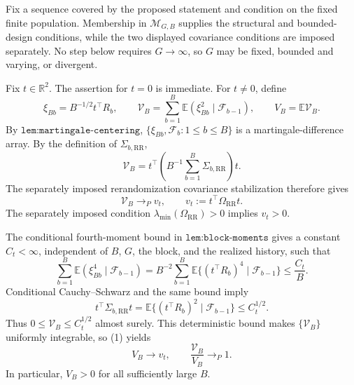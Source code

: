 Fix a sequence covered by the proposed statement and condition on the fixed finite population.  Membership in \(\mathcal M_{G,B}\) supplies the structural and bounded-design conditions, while the two displayed covariance conditions are imposed separately.  No step below requires \(G\to\infty\), so \(G\) may be fixed, bounded and varying, or divergent.

Fix \(t\in\mathbb R^2\).  The assertion for \(t=0\) is immediate.  For \(t\ne0\), define
\[
 \xi_{Bb}=B^{-1/2}t^\top R_b,
 \qquad
 \mathcal V_B=\sum_{b=1}^B
   \mathbb E(\xi_{Bb}^2\mid\mathcal F_{b-1}),
 \qquad
 V_B=\mathbb E\mathcal V_B.
\]
By \(\texttt{lem:martingale-centering}\), \(\{\xi_{Bb},\mathcal F_b:1\leq b\leq B\}\) is a martingale-difference array.  By the definition of \(\Sigma_{b,\mathrm{RR}}\),
\[
 \mathcal V_B
 =t^\top\left(B^{-1}\sum_{b=1}^B\Sigma_{b,\mathrm{RR}}\right)t.
\]
The separately imposed rerandomization covariance stabilization therefore gives
\[
 \mathcal V_B\longrightarrow_P v_t,
 \qquad
 v_t:=t^\top\Omega_{\mathrm{RR}}t.                         \tag{1}
\]
The separately imposed condition \(\lambda_{\min}(\Omega_{\mathrm{RR}})>0\) implies \(v_t>0\).

The conditional fourth-moment bound in \(\texttt{lem:block-moments}\) gives a constant \(C_t<\infty\), independent of \(B\), \(G\), the block, and the realized history, such that
\[
 \sum_{b=1}^B\mathbb E(\xi_{Bb}^4\mid\mathcal F_{b-1})
 =B^{-2}\sum_{b=1}^B
   \mathbb E\{(t^\top R_b)^4\mid\mathcal F_{b-1}\}
 \leq \frac{C_t}{B}.                                      \tag{2}
\]
Conditional Cauchy--Schwarz and the same bound imply
\[
 t^\top\Sigma_{b,\mathrm{RR}}t
 =\mathbb E\{(t^\top R_b)^2\mid\mathcal F_{b-1}\}
 \leq C_t^{1/2}.                                           \tag{3}
\]
Thus \(0\leq\mathcal V_B\leq C_t^{1/2}\) almost surely.  This deterministic bound makes \(\{\mathcal V_B\}\) uniformly integrable, so (1) yields
\[
 V_B\longrightarrow v_t,
 \qquad
 \frac{\mathcal V_B}{V_B}\longrightarrow_P1.             \tag{4}
\]
In particular, \(V_B>0\) for all sufficiently large \(B\).

